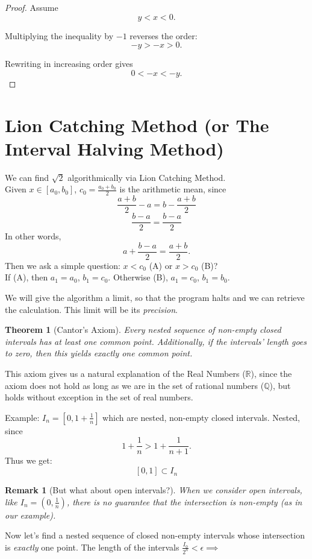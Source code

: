 \documentclass{article}
\newtheorem{theorem}{Theorem}
\newtheorem{remark}{Remark}
\begin{document}
\begin{proof}
Assume
\[
y < x < 0.
\]

Multiplying the inequality by $-1$ reverses the order:
\[
-y > -x > 0.
\]

Rewriting in increasing order gives
\[
0 < -x < -y.
\]
\end{proof}

\section{Lion Catching Method (or The Interval Halving Method)}
We can find $\sqrt{2}$ algorithmically via Lion Catching Method.\\
Given $x \in [a_0, b_0]$, $c_0 = \frac{a_0 + b_0}{2}$ is the arithmetic mean, since
\[
    \frac{a + b}{2} - a = b - \frac{a+b}{2}
\]
\[
    \frac{b-a}{2} = \frac{b-a}{2}
\]
In other words,
\[
    a + \frac{b-a}{2} = \frac{a+b}{2}.
\]
Then we ask a simple question: $x < c_0$ (A) or $x > c_0$ (B)?\\
If (A), then $a_1 = a_0$, $b_1 = c_0$. Otherwise (B), $a_1 = c_0$, $b_1 = b_0$.

We will give the algorithm a limit, so that the program halts and we can retrieve the calculation. This limit will be its \emph{precision}.

\begin{theorem}[Cantor's Axiom]
    Every nested sequence of non-empty closed intervals has at least one common point. Additionally, if the intervals' length goes to zero, then this yields \emph{exactly} one common point.
\end{theorem}
This axiom gives us a natural explanation of the Real Numbers ($\mathbb{R}$), since the axiom does not hold as long as we are in the set of rational numbers ($\mathbb{Q}$), but holds without exception in the set of real numbers.

Example: $I_n = [0, 1 + \frac{1}{n}]$ which are nested, non-empty closed intervals. Nested, since
\[
    1 + \frac{1}{n} > 1 + \frac{1}{n+1}.
\]
Thus we get:
\[
    [0, 1] \subset I_n
\]

\begin{remark}[But what about open intervals?]
When we consider open intervals, like $I_n = (0, \frac{1}{n})$, there is no guarantee that the intersection is non-empty (as in our example).
\end{remark}

Now let's find a nested sequence of closed non-empty intervals whose intersection is \emph{exactly} one point.
The length of the intervals $\frac{I_0}{2^n} < \epsilon \implies $ 
\end{document}
